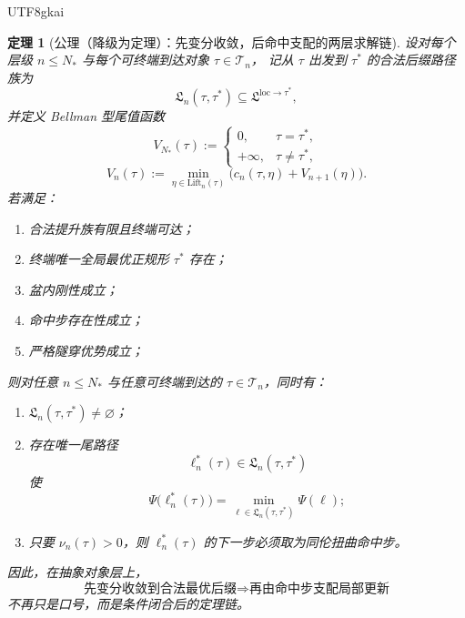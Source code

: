 \documentclass[12pt]{article}
\newtheorem{theorem}{定理}[section]
\begin{document}
\begin{CJK*}{UTF8}{gkai}
\begin{theorem}[公理（降级为定理）：先变分收敛，后命中支配的两层求解链]
\label{thm:tex1-ch5-axiom-downgraded}
设对每个层级 \(n\le N_\ast\) 与每个可终端到达对象 \(\tau\in\mathcal T_n\)，
记从 \(\tau\) 出发到 \(\tau^\ast\) 的合法后缀路径族为
\[
  \mathfrak L_n(\tau,\tau^\ast)
  \subseteq
  \mathfrak L^{\mathrm{loc}\to\tau^\ast},
\]
并定义 Bellman 型尾值函数
\[
  V_{N_\ast}(\tau)
  :=
  \begin{cases}
    0, & \tau=\tau^\ast,\\
    +\infty, & \tau\neq \tau^\ast,
  \end{cases}
\]
\[
  V_n(\tau)
  :=
  \min_{\eta\in \mathrm{Lift}_n(\tau)}
  \bigl(c_n(\tau,\eta)+V_{n+1}(\eta)\bigr).
\]
若满足：
\begin{enumerate}
  \item 合法提升族有限且终端可达；
  \item 终端唯一全局最优正规形 \(\tau^\ast\) 存在；
  \item 盆内刚性成立；
  \item 命中步存在性成立；
  \item 严格隧穿优势成立；
\end{enumerate}
则对任意 \(n\le N_\ast\) 与任意可终端到达的 \(\tau\in\mathcal T_n\)，同时有：
\begin{enumerate}
  \item \(\mathfrak L_n(\tau,\tau^\ast)\neq\varnothing\)；
  \item 存在唯一尾路径
  \[
    \ell_n^\ast(\tau)\in\mathfrak L_n(\tau,\tau^\ast)
  \]
  使
  \[
    \Psi\bigl(\ell_n^\ast(\tau)\bigr)
    =
    \min_{\ell\in\mathfrak L_n(\tau,\tau^\ast)}
    \Psi(\ell) ;
  \]
  \item 只要 \(\nu_n(\tau)>0\)，则 \(\ell_n^\ast(\tau)\) 的下一步必须取为同伦扭曲命中步。
\end{enumerate}
因此，在抽象对象层上，
\[
  \text{先变分收敛到合法最优后缀}
  \Longrightarrow
  \text{再由命中步支配局部更新}
\]
不再只是口号，而是条件闭合后的定理链。
\end{theorem}


\end{CJK*}
\end{document}
